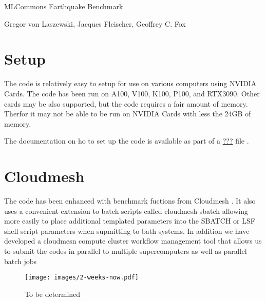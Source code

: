 \documentclass[11pt,twocolumn]{article}
\title{\TITLE}
\author{\AUTHOR}
\newcommand{\TITLE}{MLCommons Earthquake Benchmark}
\newcommand{\AUTHOR}{Gregor von Laszewski, Jacques Fleischer, Geoffrey C. Fox}
\begin{document}
\onecolumn
\begin{center}
{\huge \TITLE}

{\AUTHOR}
\end{center}

\tableofcontents
\twocolumn


\maketitle

\begin{abstract}

  We report hee the results of the MLCommonse Science Workinggroup benchmark of the Eearthquake code.

\end{abstract}


\section{Setup}

The code is relatively easy to setup for use on various computers
using NVIDIA Cards.  The code has been run on A100, V100, K100, P100,
and RTX3090. Other cards may be also supported, but the code requires
a fair amount of memory. Therfor it may not be able to be run on
NVIDIA Cards with less the 24GB of memory.

The documentation on ho to set up the code is available as part of a
\href{README.md}{???} file \cite{???}. 


\section{Cloudmesh}

The code has been enhanced with benchmark fuctions from Cloudmesh
\cite{}. It also uses a convenient extension to batch scripts called
cloudmesh-sbatch allowing more easily to place additional templated
parameters into the SBATCH or LSF shell script parameters when
supmitting to bath systems. In addition we have developed a cloudmesn
compute cluster workflow management tool that allows us to submit the
codes in parallel to multiple supercomputers as well as parallel batch
jobs \cite{las-cc,las21openapi}

\begin{figure}[htb]
\centering\texttt{[image: images/2-weeks-now.pdf]}
\caption{To be determined}
\label{fig:tbd}
\end{figure}
\end{document}
